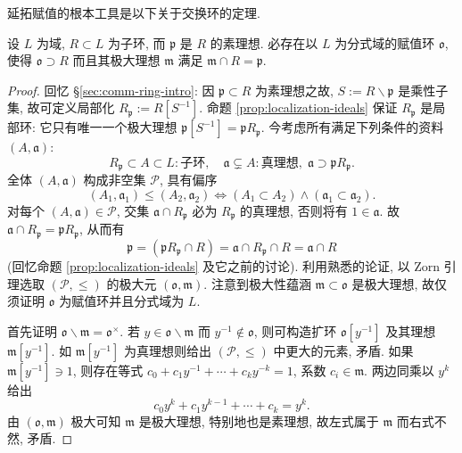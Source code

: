 延拓赋值的根本工具是以下关于交换环的定理.
\begin{theorem}[C.\ Chevalley]\label{prop:Chevalley-extension}
	设 $L$ 为域, $R \subset L$ 为子环, 而 $\mathfrak{p}$ 是 $R$ 的素理想. 必存在以 $L$ 为分式域的赋值环 $\mathfrak{o}$, 使得 $\mathfrak{o} \supset R$ 而且其极大理想 $\mathfrak{m}$ 满足 $\mathfrak{m} \cap R = \mathfrak{p}$.
\end{theorem}
\begin{proof}
	回忆 \S\ref{sec:comm-ring-intro}: 因 $\mathfrak{p} \subset R$ 为素理想之故, $S := R \smallsetminus \mathfrak{p}$ 是乘性子集, 故可定义局部化 $R_{\mathfrak{p}} := R[S^{-1}]$. 命题 \ref{prop:localization-ideals} 保证 $R_{\mathfrak{p}}$ 是局部环: 它只有唯一一个极大理想 $\mathfrak{p}[S^{-1}] = \mathfrak{p} R_{\mathfrak{p}}$. 今考虑所有满足下列条件的资料 $(A, \mathfrak{a})$:
	\[ R_{\mathfrak{p}} \subset A \subset L: \text{子环}, \quad \mathfrak{a} \subsetneq A: \text{真理想}, \; \mathfrak{a} \supset \mathfrak{p} R_{\mathfrak{p}}. \]
	全体 $(A, \mathfrak{a})$ 构成非空集 $\mathcal{P}$, 具有偏序
	\[ (A_1, \mathfrak{a}_1) \leq (A_2, \mathfrak{a}_2) \iff (A_1 \subset A_2) \wedge (\mathfrak{a}_1 \subset \mathfrak{a}_2). \]
	对每个 $(A, \mathfrak{a}) \in \mathcal{P}$, 交集 $\mathfrak{a} \cap R_{\mathfrak{p}}$ 必为 $R_{\mathfrak{p}}$ 的真理想, 否则将有 $1 \in \mathfrak{a}$. 故 $\mathfrak{a} \cap R_{\mathfrak{p}} = \mathfrak{p}R_{\mathfrak{p}}$, 从而有
	\[ \mathfrak{p} = (\mathfrak{p}R_{\mathfrak{p}} \cap R) = \mathfrak{a} \cap R_{\mathfrak{p}} \cap R = \mathfrak{a} \cap R \]
	(回忆命题 \ref{prop:localization-ideals} 及它之前的讨论). 利用熟悉的论证, 以 Zorn 引理选取 $(\mathcal{P}, \leq)$ 的极大元 $(\mathfrak{o}, \mathfrak{m})$. 注意到极大性蕴涵 $\mathfrak{m} \subset \mathfrak{o}$ 是极大理想, 故仅须证明 $\mathfrak{o}$ 为赋值环并且分式域为 $L$.

	首先证明 $\mathfrak{o} \smallsetminus \mathfrak{m} = \mathfrak{o}^\times$. 若 $y \in \mathfrak{o} \smallsetminus \mathfrak{m}$ 而 $y^{-1} \notin \mathfrak{o}$, 则可构造扩环 $\mathfrak{o}[y^{-1}]$ 及其理想 $\mathfrak{m}[y^{-1}]$. 如 $\mathfrak{m}[y^{-1}]$ 为真理想则给出 $(\mathcal{P}, \leq)$ 中更大的元素, 矛盾. 如果 $\mathfrak{m}[y^{-1}] \ni 1$, 则存在等式 $c_0 + c_1 y^{-1} + \cdots + c_k y^{-k} = 1$, 系数 $c_i \in \mathfrak{m}$. 两边同乘以 $y^k$ 给出
	\[ c_0 y^k + c_1 y^{k-1} + \cdots + c_k = y^k. \]
	由 $(\mathfrak{o}, \mathfrak{m})$ 极大可知 $\mathfrak{m}$ 是极大理想, 特别地也是素理想, 故左式属于 $\mathfrak{m}$ 而右式不然, 矛盾.


\end{proof}
